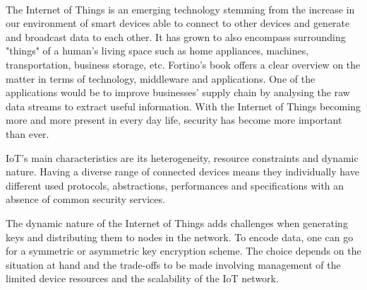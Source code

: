 \documentclass[14]{article}
\begin{document}
\author{\textbf{Faculty of Sciences and Bio-Engineering Sciences}\\[2\baselineskip]\newline\textbf{Arthur Chomé - 0529279}}

\date{ \large Security within the Internet Of things: \break A Literature Review}
\title{\vspace{-6cm}}%

\maketitle\mbox{}\\

The Internet of Things is an emerging technology\cite{atzori2010internet} stemming from the increase in our environment of smart devices able to connect to other devices and generate and broadcast data to each other. It has grown to also encompass surrounding "things" of a human’s living space such as home appliances, machines, transportation, business storage, etc. Fortino's book\cite{fortino2014internet} offers a clear overview on the matter in terms of technology, middleware and applications. One of the applications would be to improve businesses' supply chain\cite{ben2019internet} by analysing the raw data streams to extract useful information. With the Internet of Things becoming more and more present in every day life, security has become more important than ever. 
\newline

IoT's main characteristics\cite{oh2017security} are its heterogeneity, resource constraints and dynamic nature. Having a diverse range of connected devices means they individually have different used protocols\cite{sethi2017internet}, abstractions, performances and specifications with an absence of common security services.

The dynamic nature of the Internet of Things adds challenges when generating keys\cite{roman2011key} and distributing them to nodes in the network. To encode data, one can go for a symmetric\cite{gomes2014internet} or asymmetric key encryption scheme. The choice depends on the situation at hand and the trade-offs to be made involving management of the limited device resources\cite{katagi2008lightweight} and the scalability of the IoT network\cite{gomes2014internet}.
\end{document}

